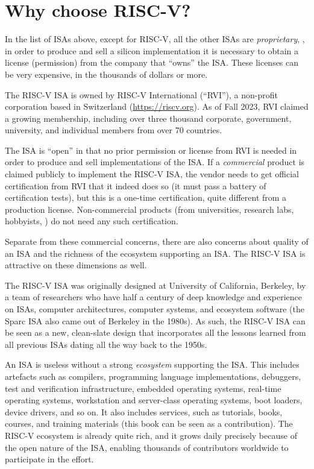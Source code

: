 
\section{Why choose RISC-V?}

In the list of ISAs above, except for RISC-V, all the other ISAs are
\emph{proprietary}, {\ie}, in order to produce and sell a silicon
implementation it is necessary to obtain a license (permission) from
the company that ``owns'' the ISA.  These licenses can be very
expensive, in the thousands of dollars or more.

The RISC-V ISA is owned by RISC-V International (``RVI''), a
non-profit corporation based in Switzerland (\url{https://riscv.org}).
As of Fall 2023, RVI claimed a growing membership, including over
three thousand corporate, government, university, and individual
members from over 70 countries.

The ISA is ``open'' in that no prior permission or license from RVI is
needed in order to produce and sell implementations of the ISA.  If a
\emph{commercial} product is claimed publicly to implement the RISC-V
ISA, the vendor needs to get official certification from RVI that it
indeed does so (it must pass a battery of certification tests), but
this is a one-time certification, quite different from a production
license.  Non-commercial products (from universities, research labs,
hobbyists, {\etc}) do not need any such certification.

Separate from these commercial concerns, there are also concerns about
quality of an ISA and the richness of the ecosystem supporting an ISA.
The RISC-V ISA is attractive on these dimensions as well.

The RISC-V ISA was originally designed at University of California,
Berkeley, by a team of researchers who have half a century of deep
knowledge and experience on ISAs, computer architectures, computer
systems, and ecosystem software (the Sparc ISA also came out of
Berkeley in the 1980s).  As such, the RISC-V ISA can be seen as a new,
clean-slate design that incorporates all the lessons learned from all
previous ISAs dating all the way back to the 1950s.

An ISA is useless without a strong \emph{ecosystem} supporting the
ISA.  This includes artefacts such as compilers, programming language
implementations, debuggers, test and verification infrastructure,
embedded operating systems, real-time operating systems, workstation
and server-class operating systems, boot loaders, device drivers, and
so on.  It also includes services, such as tutorials, books, courses,
and training materials (this book can be seen as a contribution).  The
RISC-V ecosystem is already quite rich, and it grows daily precisely
because of the open nature of the ISA, enabling thousands of
contributors worldwide to participate in the effort.

